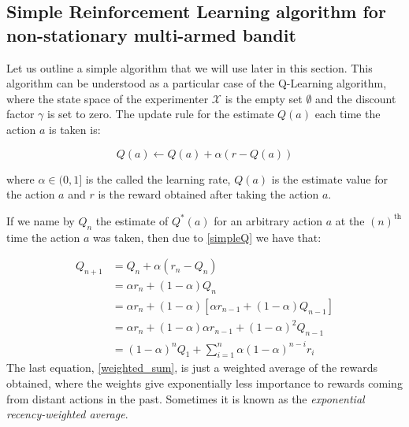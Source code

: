 \documentclass[11pt,a4paper,twoside]{report}
\newcommand{\+}{\textnormal{+} }
\theoremstyle{definition}
\numberwithin{equation}{chapter}
\begin{document}
\subsection{Simple Reinforcement Learning algorithm for non-stationary
multi-armed bandit} \label{SimpleRL}

Let us outline a simple algorithm that we will use later in this section. This
algorithm can be understood as a particular case of the Q-Learning algorithm,
where the state space of the experimenter $\mathcal{X}$ is the empty set
$\emptyset$ and the discount factor $\gamma$ is set to zero. The update rule for
the estimate $Q(a)$ each time the action $a$ is taken is:

\begin{equation}
  Q(a) \leftarrow Q(a) + \alpha \left( r - Q(a) \right)
  \label{simpleQ}
\end{equation}

where $\alpha \in (0,1]$ is the called the learning rate, $Q(a)$ is the
estimate value for the action $a$ and $r$ is the reward obtained after taking
the action $a$.

If we name by $Q_n$ the estimate of $Q^*(a)$ for an arbitrary action $a$ at the
 $(n)^\text{th}$ time the action $a$ was taken, then due to \eqref{simpleQ} we
 have that:

 \begin{align}
  Q_{n+1} &=Q_{n}+\alpha\left(r_{n}-Q_{n}\right) \\
  &=\alpha r_{n}+(1-\alpha) Q_{n} \\
  &=\alpha r_{n}+(1-\alpha)\left[\alpha r_{n-1}+(1-\alpha) Q_{n-1}\right] \\
  &=\alpha r_{n}+(1-\alpha) \alpha r_{n-1}+(1-\alpha)^{2} Q_{n-1} \\
  &=(1-\alpha)^{n} Q_{1}+\sum_{i=1}^{n} \alpha(1-\alpha)^{n-i} r_{i}
  \label{weighted_sum}
  \end{align}
The last equation, \eqref{weighted_sum}, is just a weighted average of the
rewards obtained, where the weights give exponentially less importance to
rewards coming from distant actions in the past. Sometimes it is known as the
\textit{exponential recency-weighted average}.
\end{document}
